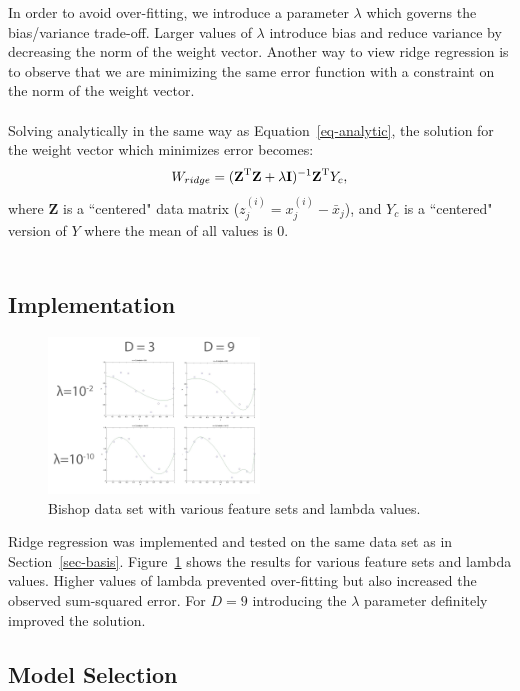\documentclass[11pt]{article}   %
\theoremstyle{plain}
\begin{document}
In order to avoid over-fitting, we introduce a parameter $\lambda$ which governs the bias/variance trade-off. Larger values of $\lambda$ introduce bias and reduce variance by decreasing the norm of the weight vector. Another way to view ridge regression is to observe that we are minimizing the same error function with a constraint on the norm of the weight vector. \\
\\
\indent Solving analytically in the same way as Equation~\ref{eq-analytic}, the solution for the weight vector which minimizes error becomes:
\begin{equation}
W_{ridge} = (\textbf{Z}^\textnormal{T}\textbf{Z}+\lambda \textbf{I})^{-1} \textbf{Z}^\textnormal{T} Y_c,
\end{equation}
where $\textbf{Z}$ is a ``centered" data matrix ($z_j^{(i)} = x_j^{(i)} - \bar{x}_j$), and $Y_c$ is a ``centered" version of $Y$ where the mean of all values is 0. \\
\\
\indent

\subsection{Implementation}

\begin{figure}[h!]\label{fig-ridge-bishop}
  \caption{Bishop data set with various feature sets and lambda values.}
  \centering
    \includegraphics[width=0.5\textwidth]{figures/problem_2_3_bishop.png}
\end{figure}

Ridge regression was implemented and tested on the same data set as in Section~\ref{sec-basis}. Figure~\ref{fig-ridge-bishop} shows the results for various feature sets and lambda values. Higher values of lambda prevented over-fitting but also increased the observed sum-squared error. For $D = 9$ introducing the $\lambda$ parameter definitely improved the solution.

\subsection{Model Selection}
\end{document}
